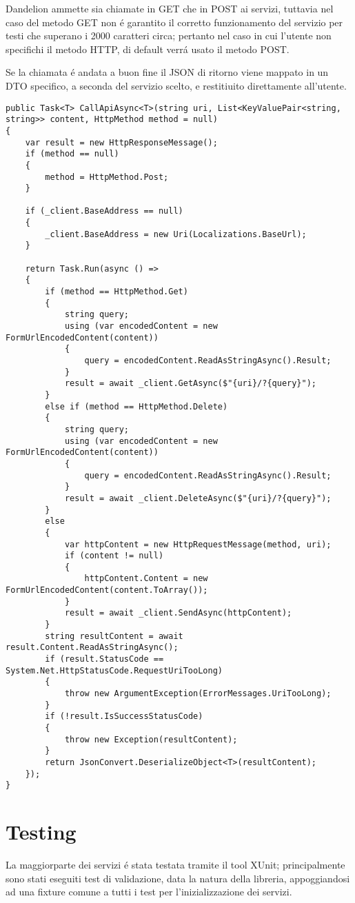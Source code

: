 Dandelion ammette sia chiamate in GET che in POST ai servizi, tuttavia nel caso del metodo GET non \'e garantito il corretto 
funzionamento del servizio per testi che superano i 2000 caratteri circa; pertanto nel caso in cui l'utente non specifichi il metodo HTTP, di default verr\'a
usato il metodo POST.

Se la chiamata \'e andata a buon fine il JSON di ritorno viene mappato in un DTO specifico, a seconda del servizio scelto, e restitiuito direttamente all'utente.

\begin{lstlisting}[style=CSharpStyle]
public Task<T> CallApiAsync<T>(string uri, List<KeyValuePair<string, string>> content, HttpMethod method = null)
{
    var result = new HttpResponseMessage();
    if (method == null)
    {
        method = HttpMethod.Post;
    }

    if (_client.BaseAddress == null)
    {
        _client.BaseAddress = new Uri(Localizations.BaseUrl);
    }

    return Task.Run(async () =>
    {
        if (method == HttpMethod.Get)
        {
            string query;
            using (var encodedContent = new FormUrlEncodedContent(content))
            {
                query = encodedContent.ReadAsStringAsync().Result;
            }
            result = await _client.GetAsync($"{uri}/?{query}");
        }
        else if (method == HttpMethod.Delete)
        {
            string query;
            using (var encodedContent = new FormUrlEncodedContent(content))
            {
                query = encodedContent.ReadAsStringAsync().Result;
            }
            result = await _client.DeleteAsync($"{uri}/?{query}");
        }
        else
        {
            var httpContent = new HttpRequestMessage(method, uri);
            if (content != null)
            {
                httpContent.Content = new FormUrlEncodedContent(content.ToArray());
            }
            result = await _client.SendAsync(httpContent);
        }
        string resultContent = await result.Content.ReadAsStringAsync();
        if (result.StatusCode == System.Net.HttpStatusCode.RequestUriTooLong)
        {
            throw new ArgumentException(ErrorMessages.UriTooLong);
        }
        if (!result.IsSuccessStatusCode)
        {
            throw new Exception(resultContent); 
        }
        return JsonConvert.DeserializeObject<T>(resultContent);
    });
}
\end{lstlisting}

\section{Testing}
La maggiorparte dei servizi \'e stata testata tramite il tool XUnit; principalmente sono stati eseguiti test di validazione, data la natura della libreria, appoggiandosi 
ad una fixture comune a tutti i test per l'inizializzazione dei servizi.

